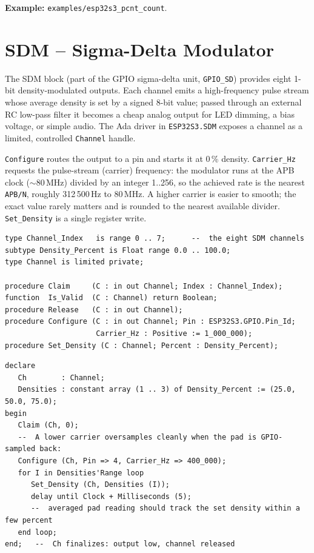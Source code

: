 \noindent\textbf{Example:} \texttt{examples/esp32s3\_pcnt\_count}.

\section{SDM -- Sigma-Delta Modulator}
\label{app:int:sdm}

The SDM block (part of the GPIO sigma-delta unit, \texttt{GPIO\_SD}) provides
eight 1-bit density-modulated outputs. Each channel emits a high-frequency pulse
stream whose average density is set by a signed 8-bit value; passed through an
external RC low-pass filter it becomes a cheap analog output for LED dimming, a
bias voltage, or simple audio. The Ada driver in \texttt{ESP32S3.SDM} exposes a
channel as a limited, controlled \texttt{Channel} handle.

\texttt{Configure} routes the output to a pin and starts it at 0\,\% density.
\texttt{Carrier\_Hz} requests the pulse-stream (carrier) frequency: the modulator
runs at the APB clock ($\sim$80\,MHz) divided by an integer 1..256, so the
achieved rate is the nearest \texttt{APB/N}, roughly 312\,500\,Hz to 80\,MHz. A
higher carrier is easier to smooth; the exact value rarely matters and is rounded
to the nearest available divider. \texttt{Set\_Density} is a single register
write.

\begin{lstlisting}
type Channel_Index   is range 0 .. 7;      --  the eight SDM channels
subtype Density_Percent is Float range 0.0 .. 100.0;
type Channel is limited private;

procedure Claim     (C : in out Channel; Index : Channel_Index);
function  Is_Valid  (C : Channel) return Boolean;
procedure Release   (C : in out Channel);
procedure Configure (C : in out Channel; Pin : ESP32S3.GPIO.Pin_Id;
                     Carrier_Hz : Positive := 1_000_000);
procedure Set_Density (C : Channel; Percent : Density_Percent);
\end{lstlisting}

\begin{lstlisting}
declare
   Ch        : Channel;
   Densities : constant array (1 .. 3) of Density_Percent := (25.0, 50.0, 75.0);
begin
   Claim (Ch, 0);
   --  A lower carrier oversamples cleanly when the pad is GPIO-sampled back:
   Configure (Ch, Pin => 4, Carrier_Hz => 400_000);
   for I in Densities'Range loop
      Set_Density (Ch, Densities (I));
      delay until Clock + Milliseconds (5);
      --  averaged pad reading should track the set density within a few percent
   end loop;
end;   --  Ch finalizes: output low, channel released
\end{lstlisting}

